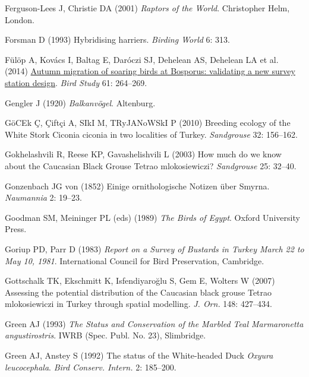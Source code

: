 \documentclass[
  letterpaper,
  DIV=11,
  numbers=noendperiod]{scrreprt}
\newlength{\cslhangindent}
\newenvironment{CSLReferences}[2] %
 {\begin{list}{}{%
  \setlength{\itemindent}{0pt}
  \setlength{\leftmargin}{0pt}
  \setlength{\parsep}{0pt}
  \ifodd #1
   \setlength{\leftmargin}{\cslhangindent}
   \setlength{\itemindent}{-1\cslhangindent}
  \fi
  \setlength{\itemsep}{#2\baselineskip}}}
 {\end{list}}
\begin{document}
\begin{CSLReferences}{0}{1}
Ferguson-Lees J, Christie DA (2001) \emph{{Raptors of the World}}.
Christopher Helm, London.

Forsman D (1993) {Hybridising harriers}. \emph{Birding World} 6: 313.

Fülöp A, Kovács I, Baltag E, Daróczi SJ, Dehelean AS, Dehelean LA et al.
(2014) \href{https://doi.org/10.1080/00063657.2014.907236}{{Autumn
migration of soaring birds at Bosporus: validating a new survey station
design}}. \emph{Bird Study} 61: 264--269.

Gengler J (1920) \emph{{Balkanvögel}}. Altenburg.

GöCEk Ç, Çiftçi A, SIkI M, TRyJANoWSkI P (2010) {Breeding ecology of the
White Stork Ciconia ciconia in two localities of Turkey}.
\emph{Sandgrouse} 32: 156--162.

Gokhelashvili R, Reese KP, Gavashelishvili L (2003) {How much do we know
about the Caucasian Black Grouse Tetrao mlokosiewiczi?}
\emph{Sandgrouse} 25: 32--40.

Gonzenbach JG von (1852) {Einige ornithologische Notizen über Smyrna}.
\emph{Naumannia} 2: 19--23.

Goodman SM, Meininger PL (eds) (1989) \emph{{The Birds of Egypt}}.
Oxford University Press.

Goriup PD, Parr D (1983) \emph{{Report on a Survey of Bustards in Turkey
March 22 to May 10, 1981}}. International Council for Bird Preservation,
Cambridge.

Gottschalk TK, Ekschmitt K, Isfendiyaroğlu S, Gem E, Wolters W (2007)
{Assessing the potential distribution of the Caucasian black grouse
Tetrao mlokosiewiczi in Turkey through spatial modelling}. \emph{J.
Orn.} 148: 427--434.

Green AJ (1993) \emph{{The Status and Conservation of the Marbled Teal
Marmaronetta angustirostris}}. IWRB (Spec. Publ. No. 23), Slimbridge.

Green AJ, Anstey S (1992) {The status of the White-headed Duck
\emph{Oxyura leucocephala}}. \emph{Bird Conserv. Intern.} 2: 185--200.


\end{CSLReferences}
\end{document}
